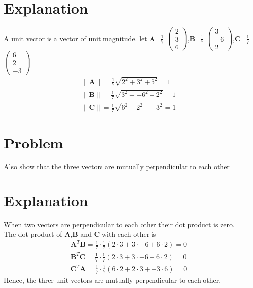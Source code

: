 \documentclass[journal,12pt,twocolumn]{IEEEtran}
\newcommand{\norm}[1]{\| #1 \|}
\begin{document}
\section{Explanation}
A unit vector is a vector of unit magnitude.
\vspace{0.5cm} let $\bm{A}$=\(\frac{1}{7}\) $\begin{pmatrix}2 \\3 \\6\end{pmatrix}$,$\bm{B}$=\(\frac{1}{7}\) $\begin{pmatrix}3 \\-6 \\2\end{pmatrix}$,$\bm{C}$=\(\frac{1}{7}\) $\begin{pmatrix}6 \\2 \\-3\end{pmatrix}$\\
\begin{align}
    \norm{\bm{A}}=\frac{1}{7}\sqrt{2^2+3^2+6^2}=1\\
    \norm{\bm{B}}=\frac{1}{7}\sqrt{3^2+-6^2+2^2}=1\\
    \norm{\bm{C}}=\frac{1}{7}\sqrt{6^2+2^2+-3^2}=1
\end{align}
\section{Problem}
Also show that the three vectors are mutually perpendicular to each other
\section{Explanation}
\noindent
When two vectors are perpendicular to each other their dot product is zero.\\
The dot product of $\bm{A}$,$\bm{B}$ and $\bm{C}$ with each other is\\
\begin{align}
    \bm{A}^T\bm{B}=\frac{1}{7}\cdot\frac{1}{7}(2\cdot3+3\cdot-6+6\cdot2)=0\\
    \bm{B}^T\bm{C}=\frac{1}{7}\cdot\frac{1}{7}(2\cdot3+3\cdot-6+6\cdot2)=0\\
    \bm{C}^T\bm{A}=\frac{1}{7}\cdot\frac{1}{7}(6\cdot2+2\cdot3+-3\cdot6)=0
\end{align}
Hence, the three unit vectors are mutually perpendicular to each other.
\end{document}

